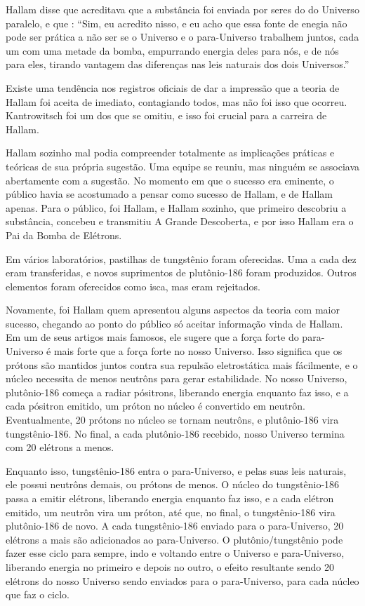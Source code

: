 \documentclass[14pt,portuguese]{extreport}
\begin{document}
	  Hallam disse que acreditava que a substância foi enviada por seres do do Universo paralelo, e que : “Sim, eu acredito nisso, e eu acho que essa fonte de enegia não pode ser prática a não ser se o Universo e o para-Universo 
	  trabalhem juntos, cada um com uma metade da bomba, empurrando energia deles para nós, e de nós para eles, tirando vantagem das diferenças nas leis naturais dos dois Universos.”
	  
	  Existe uma tendência nos registros oficiais de dar a impressão que a teoria de Hallam foi aceita de imediato, contagiando todos, mas não foi isso que ocorreu. Kantrowitsch foi um dos que se 
	  omitiu, e isso foi crucial para a carreira de Hallam. 
	  
	  Hallam sozinho mal podia compreender totalmente as implicações práticas e teóricas de sua própria sugestão. Uma equipe se reuniu, mas 
	  ninguém se associava abertamente com a sugestão. No momento em que o sucesso era eminente, o público havia se acostumado a pensar como sucesso de Hallam, e de Hallam apenas. Para o público, foi Hallam, e Hallam sozinho, que primeiro descobriu a substância, concebeu e transmitiu A Grande Descoberta, e por isso Hallam era o Pai da Bomba de Elétrons.
	  
	  Em vários laboratórios, pastilhas de tungstênio foram oferecidas. Uma a cada dez eram transferidas, e novos suprimentos de plutônio-186 foram produzidos. Outros elementos foram oferecidos como isca, mas eram rejeitados.
	  
	  Novamente, foi Hallam quem apresentou alguns aspectos da teoria com maior sucesso, chegando ao ponto do público só aceitar informação vinda de Hallam. Em um de seus artigos mais famosos, ele sugere que a força forte do para-Universo é mais forte que a força forte no nosso Universo. Isso significa que os prótons são mantidos juntos contra sua repulsão eletrostática mais fácilmente, e o núcleo necessita de menos neutrôns para gerar estabilidade. No nosso Universo, plutônio-186 começa a radiar pósitrons, liberando energia enquanto faz isso, e a cada pósitron emitido, um próton no núcleo é convertido em neutrôn. Eventualmente, 20 prótons no núcleo se tornam neutrôns, e plutônio-186 vira tungstênio-186. No final, a cada plutônio-186 recebido, nosso Universo termina com 20 elétrons a menos.
	  
	  Enquanto isso, tungstênio-186 entra o para-Universo, e pelas suas leis naturais, ele possui neutrôns demais, ou prótons de menos. O núcleo do tungstênio-186 passa a emitir elétrons, liberando energia enquanto faz isso, e a cada elétron emitido, um neutrôn vira um próton, até que, no final, o tungstênio-186 vira plutônio-186 de novo. A cada tungstênio-186 enviado para o para-Universo, 20 elétrons a mais são adicionados ao para-Universo. O plutônio/tungstênio pode fazer esse ciclo para sempre, indo e voltando entre o Universo e para-Universo, liberando energia no primeiro e depois no outro, o efeito resultante sendo 20 elétrons do nosso Universo sendo enviados para o para-Universo, para cada núcleo que faz o ciclo. 
\end{document}

